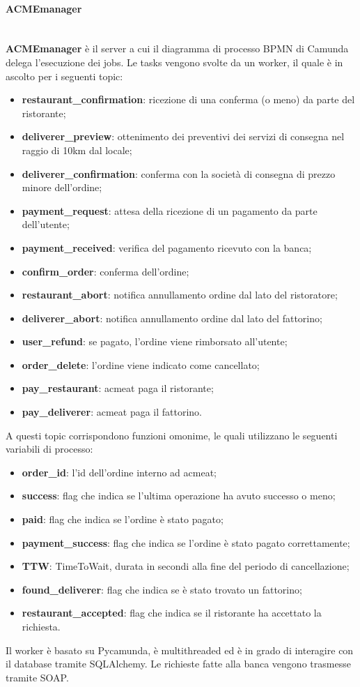 \documentclass[11pt]{article} %
\begin{document}
\paragraph{ACMEmanager}\mbox{}\\
\textbf{ACMEmanager} è il server a cui il diagramma di processo BPMN di Camunda delega l'esecuzione dei jobs. Le tasks vengono svolte da un worker, il quale è in ascolto per i seguenti topic:
\begin{itemize}
\item \textbf{restaurant\_confirmation}: ricezione di una conferma (o meno) da parte del ristorante;
\item \textbf{deliverer\_preview}: ottenimento dei preventivi dei servizi di consegna nel raggio di 10km dal locale;
\item \textbf{deliverer\_confirmation}: conferma con la società di consegna di prezzo minore dell'ordine;
\item \textbf{payment\_request}: attesa della ricezione di un pagamento da parte dell'utente;
\item \textbf{payment\_received}: verifica del pagamento ricevuto con la banca;
\item \textbf{confirm\_order}: conferma dell'ordine;
\item \textbf{restaurant\_abort}: notifica annullamento ordine dal lato del ristoratore;
\item \textbf{deliverer\_abort}: notifica annullamento ordine dal lato del fattorino;
\item \textbf{user\_refund}: se pagato, l'ordine viene rimborsato all'utente;
\item \textbf{order\_delete}: l'ordine viene indicato come cancellato;
\item \textbf{pay\_restaurant}: acmeat paga il ristorante;
\item \textbf{pay\_deliverer}: acmeat paga il fattorino.
\end{itemize}
A questi topic corrispondono funzioni omonime, le quali utilizzano le seguenti variabili di processo:
\begin{itemize}
\item \textbf{order\_id}: l'id dell'ordine interno ad acmeat;
\item \textbf{success}: flag che indica se l'ultima operazione ha avuto successo o meno;
\item \textbf{paid}: flag che indica se l'ordine è stato pagato;
\item \textbf{payment\_success}: flag che indica se l'ordine è stato pagato correttamente;
\item \textbf{TTW}: TimeToWait, durata in secondi alla fine del periodo di cancellazione;
\item \textbf{found\_deliverer}: flag che indica se è stato trovato un fattorino;
\item \textbf{restaurant\_accepted}: flag che indica se il ristorante ha accettato la richiesta.
\end{itemize}
Il worker è basato su Pycamunda, è multithreaded ed è in grado di interagire con il database tramite SQLAlchemy. Le richieste fatte alla banca vengono trasmesse tramite SOAP.
\end{document}
